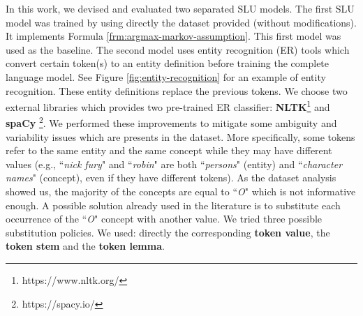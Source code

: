 \documentclass[11pt,a4paper]{article}
\begin{document}
In this work, we devised and evaluated two separated SLU models. 
The first SLU model was trained by using directly the dataset provided (without modifications). It 
implements Formula \ref{frm:argmax-markov-assumption}. 
This first model was used as the baseline. The second model uses entity recognition (ER) tools which convert certain token(s) to an entity definition before training the complete language model. See Figure \ref{fig:entity-recognition} for an example of entity recognition. These entity definitions replace the previous tokens. We choose two external libraries which provides two pre-trained ER classifier: \textbf{NLTK}\footnote{https://www.nltk.org/} and \textbf{spaCy} \footnote{https://spacy.io/}. 
We performed these improvements to mitigate some ambiguity and variability issues which are presents in the dataset. 
More specifically, some tokens refer to the same entity 
and the same concept while they may have different values 
(e.g., ``\textit{nick fury}" and ``\textit{robin}" are both 
``\textit{persons}" (entity) and ``\textit{character names}" (concept), even if  they have different tokens). 
As the dataset analysis showed us, the majority of the concepts are equal to ``\textit{O}" which is not informative enough. A possible solution already used in the literature is to substitute each occurrence of the  ``\textit{O}" concept with another value. We tried three possible substitution policies. We used: 
directly the corresponding \textbf{token value}, the \textbf{token stem} and the \textbf{token lemma}.
 
\end{document}
